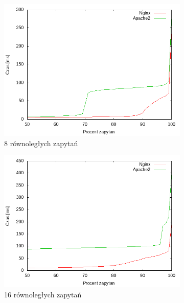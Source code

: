 \begin{figure}
	\begin{subfigure}[h]{0.3\textwidth}
		\includegraphics[width=\textwidth]{testy/wybor_index_duzy_8.png}
		\caption{8 równoległych zapytań}
	\end{subfigure}
	\begin{subfigure}[h]{0.3\textwidth}
		\includegraphics[width=\textwidth]{testy/wybor_index_duzy_16.png}
		\caption{16 równoległych zapytań}
	\end{subfigure}
	\begin{subfigure}[h]{0.3\textwidth}

\end{subfigure}
\end{figure}
